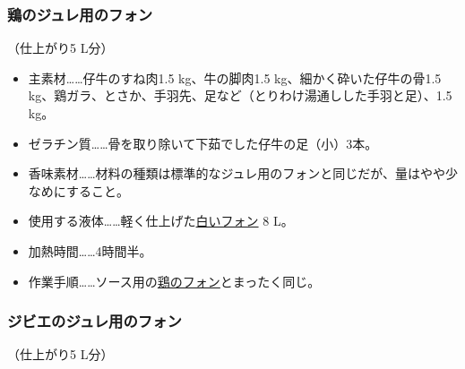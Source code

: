 \begin{recette}
\hypertarget{fonds-pour-gelee-de-volaille}{%
\subsubsection{鶏のジュレ用のフォン}\label{fonds-pour-gelee-de-volaille}}



（仕上がり5 L分）

\begin{itemize}
\item
  主素材\ldots{}\ldots{}仔牛のすね肉1.5 kg、牛の脚肉1.5
  kg、細かく砕いた仔牛の骨1.5
  kg、鶏ガラ、とさか、手羽先、足など（とりわけ湯通しした手羽と足）、1.5
  kg。
\item
  ゼラチン質\ldots{}\ldots{}骨を取り除いて下茹でした仔牛の足（小）3本。
\item
  香味素材\ldots{}\ldots{}材料の種類は標準的なジュレ用のフォンと同じだが、量はやや少なめにすること。
\item
  使用する液体\ldots{}\ldots{}軽く仕上げた\protect\hyperlink{fonds-blanc}{白いフォン}
  8 L。
\item
  加熱時間\ldots{}\ldots{}4時間半。
\item
  作業手順\ldots{}\ldots{}ソース用の\protect\hyperlink{fonds-de-volaille}{鶏のフォン}とまったく同じ。
\end{itemize}

\hypertarget{fonds-pour-gelee-de-gibier}{%
\subsubsection{ジビエのジュレ用のフォン}\label{fonds-pour-gelee-de-gibier}}



（仕上がり5 L分）


\end{recette}
